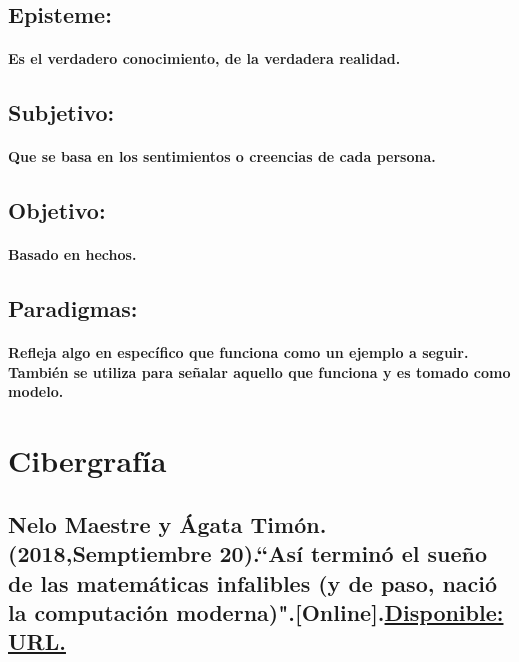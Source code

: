 \documentclass{report}   %
\begin{document}
    \subsection{Episteme:}
        \paragraph{ Es el verdadero conocimiento, de la verdadera realidad.}
    \subsection{Subjetivo:}
        \paragraph{ Que se basa en los sentimientos o creencias de cada persona.}
    \subsection{Objetivo:}
        \paragraph{ Basado en hechos.}
    \subsection{Paradigmas:}
        \paragraph{ Refleja algo en específico que funciona como un ejemplo a seguir. También se utiliza para señalar aquello que funciona y es tomado como modelo.}
        
\section{Cibergrafía}
    \subsection{Nelo Maestre y Ágata Timón.(2018,Semptiembre 20).``Así terminó el sueño de las matemáticas infalibles (y de paso, nació la computación moderna)".[Online].\href{https://www.bbvaopenmind.com/ciencia/matematicas/asi-termino-el-sueno-de-las-matematicas-infalibles/?utm_source=materia&utm_medium=facebook&tipo=elabora&cid=soc:afl:fb:----materia:--:::::::sitlnk:materia:&fbclid=IwAR2oBVdboWbxmrIAqVbiA2hZrBTjcvLSl6RQ5Fh5UQX2ZvvybK8MlpGi3gM}{Disponible: URL.}}
\end{document}

